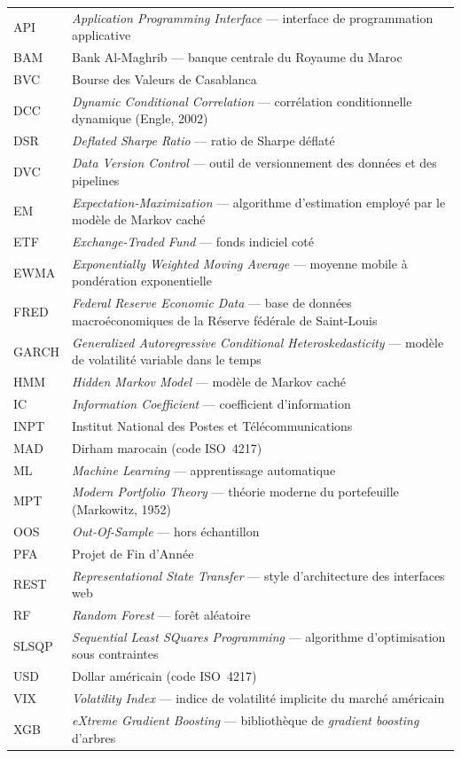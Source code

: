 \begin{longtable}{@{}p{2.6cm}p{11.4cm}@{}}
API & \emph{Application Programming Interface} — interface de programmation
applicative \\
BAM & Bank Al-Maghrib — banque centrale du Royaume du Maroc \\
BVC & Bourse des Valeurs de Casablanca \\
DCC & \emph{Dynamic Conditional Correlation} — corrélation conditionnelle
dynamique (Engle, 2002) \\
DSR & \emph{Deflated Sharpe Ratio} — ratio de Sharpe déflaté \\
DVC & \emph{Data Version Control} — outil de versionnement des données et des
pipelines \\
EM & \emph{Expectation-Maximization} — algorithme d'estimation employé par le
modèle de Markov caché \\
ETF & \emph{Exchange-Traded Fund} — fonds indiciel coté \\
EWMA & \emph{Exponentially Weighted Moving Average} — moyenne mobile à
pondération exponentielle \\
FRED & \emph{Federal Reserve Economic Data} — base de données macroéconomiques
de la Réserve fédérale de Saint-Louis \\
GARCH & \emph{Generalized Autoregressive Conditional Heteroskedasticity} —
modèle de volatilité variable dans le temps \\
HMM & \emph{Hidden Markov Model} — modèle de Markov caché \\
IC & \emph{Information Coefficient} — coefficient d'information \\
INPT & Institut National des Postes et Télécommunications \\
MAD & Dirham marocain (code ISO~4217) \\
ML & \emph{Machine Learning} — apprentissage automatique \\
MPT & \emph{Modern Portfolio Theory} — théorie moderne du portefeuille
(Markowitz, 1952) \\
OOS & \emph{Out-Of-Sample} — hors échantillon \\
PFA & Projet de Fin d'Année \\
REST & \emph{Representational State Transfer} — style d'architecture des
interfaces web \\
RF & \emph{Random Forest} — forêt aléatoire \\
SLSQP & \emph{Sequential Least SQuares Programming} — algorithme
d'optimisation sous contraintes \\
USD & Dollar américain (code ISO~4217) \\
VIX & \emph{Volatility Index} — indice de volatilité implicite du marché
américain \\
XGB & \emph{eXtreme Gradient Boosting} — bibliothèque de \emph{gradient
boosting} d'arbres \\
\bottomrule
\end{longtable}
